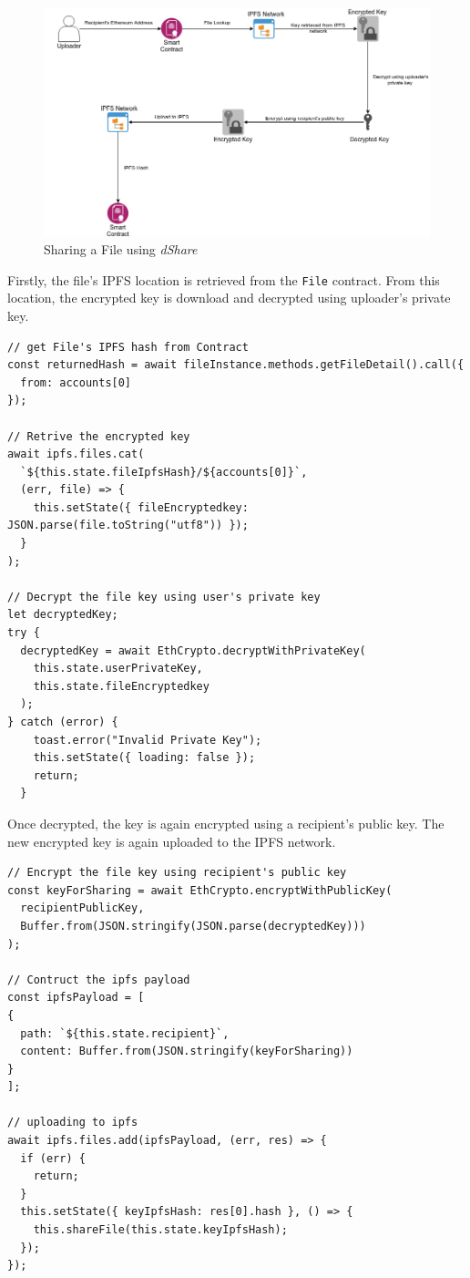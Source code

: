 \documentclass[]{article}
\begin{document}
		\begin{figure}[h]
			\includegraphics[width=\linewidth]{share.png}
			\caption{Sharing a File using \textit{dShare}}
			\label{fig:share}
		\end{figure}
	
		Firstly, the file's IPFS location is retrieved from the \texttt{File} contract. From this location, the encrypted key is download and decrypted using uploader's private key.
		
\begin{verbatim}
// get File's IPFS hash from Contract
const returnedHash = await fileInstance.methods.getFileDetail().call({
  from: accounts[0]
});

// Retrive the encrypted key
await ipfs.files.cat(
  `${this.state.fileIpfsHash}/${accounts[0]}`,
  (err, file) => {
    this.setState({ fileEncryptedkey: JSON.parse(file.toString("utf8")) });
  }
);

// Decrypt the file key using user's private key
let decryptedKey;
try {
  decryptedKey = await EthCrypto.decryptWithPrivateKey(
    this.state.userPrivateKey,
    this.state.fileEncryptedkey
  );
} catch (error) {
    toast.error("Invalid Private Key");
    this.setState({ loading: false });
    return;
  }
\end{verbatim}

		Once decrypted, the key is again encrypted using a recipient's public key. The new encrypted key is again uploaded to the IPFS network.
		
\begin{verbatim}
// Encrypt the file key using recipient's public key
const keyForSharing = await EthCrypto.encryptWithPublicKey(
  recipientPublicKey,
  Buffer.from(JSON.stringify(JSON.parse(decryptedKey)))
);

// Contruct the ipfs payload
const ipfsPayload = [
{
  path: `${this.state.recipient}`,
  content: Buffer.from(JSON.stringify(keyForSharing))
}
];

// uploading to ipfs
await ipfs.files.add(ipfsPayload, (err, res) => {
  if (err) {
    return;
  }
  this.setState({ keyIpfsHash: res[0].hash }, () => {
    this.shareFile(this.state.keyIpfsHash);
  });
});
\end{verbatim}
\end{document}
